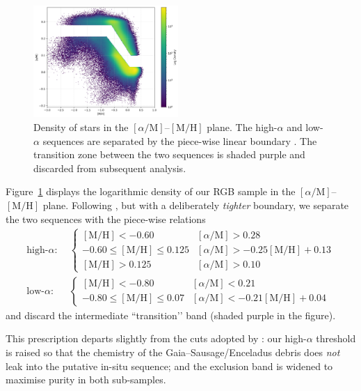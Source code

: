\documentclass[a4paper,12pt]{article}
\begin{document}
\begin{figure}[h]
    \centering
    \includegraphics[width=0.49\textwidth]{../figures/alpha_vs_metalicity.png}
    \caption{Density of stars in the $[\alpha/\mathrm{M}]$–$[\mathrm{M/H}]$ plane.
             The high-$\alpha$ and low-$\alpha$ sequences are separated by the
             piece-wise linear boundary . The transition zone
             between the two sequences is shaded purple and discarded from
             subsequent analysis.}
    \label{fig:alphametal}
\end{figure}


  
Figure~\ref{fig:alphametal} displays the logarithmic density of our
RGB sample in the $[\alpha/\mathrm{M}]$–$[\mathrm{M/H}]$ plane.  Following
\citet{Chandra_2024}, but with a deliberately \emph{tighter} boundary, we
separate the two sequences with the piece-wise relations
%
\[
\begin{aligned}
\text{high-}\alpha:\;&
  \begin{cases}
    [\mathrm{M/H}]<-0.60 &
      [\alpha/\mathrm{M}]>0.28\\
    -0.60\le[\mathrm{M/H}]\le0.125 &
      [\alpha/\mathrm{M}]>-0.25[\mathrm{M/H}]+0.13\\
    [\mathrm{M/H}]>0.125 &
      [\alpha/\mathrm{M}]>0.10
  \end{cases}\\[4pt]
\text{low-}\alpha:\;&
  \begin{cases}
    [\mathrm{M/H}]<-0.80 &
      [\alpha/\mathrm{M}]<0.21\\
    -0.80\le[\mathrm{M/H}]\le0.07 &
      [\alpha/\mathrm{M}]<-0.21[\mathrm{M/H}]+0.04
  \end{cases}
\end{aligned}
\]
%
and discard the intermediate “transition’’ band (shaded purple in the
figure).

This prescription departs slightly from the cuts adopted by
\citet{Chandra_2024}:  
our high-$\alpha$ threshold is raised so that the
chemistry of the Gaia–Sausage/Enceladus debris
\citep{Belokurov2018,Helmi2018} does \emph{not} leak into the putative
in-situ sequence;  
and the exclusion band is widened to maximise purity in both
sub-samples.  
\end{document}
